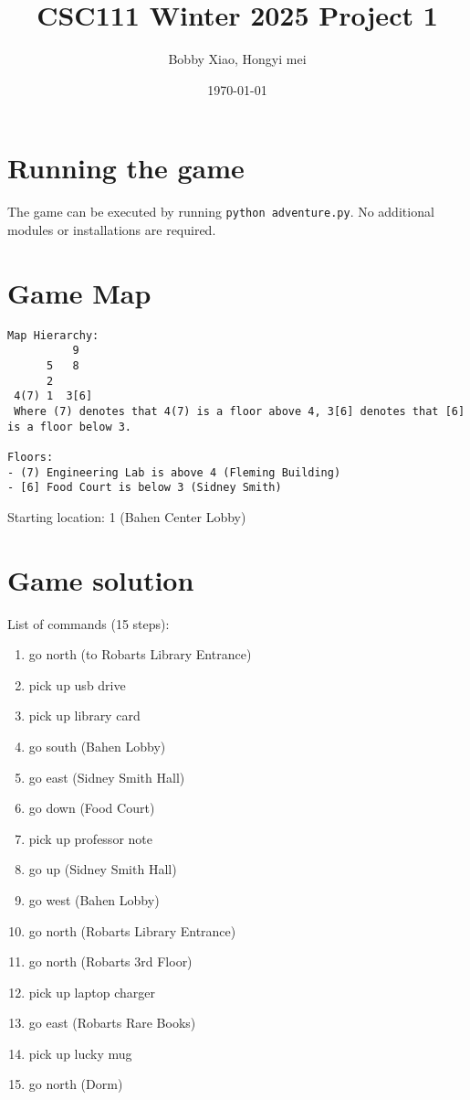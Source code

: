 \documentclass[11pt]{article}
\title{CSC111 Winter 2025 Project 1}
\author{Bobby Xiao, Hongyi mei}
\date{\today}
\begin{document}
\maketitle

\section*{Running the game}
The game can be executed by running \texttt{python adventure.py}. No additional modules or installations are required.

\section*{Game Map}
\begin{verbatim}
Map Hierarchy:
          9
      5   8
      2   
 4(7) 1  3[6]
 Where (7) denotes that 4(7) is a floor above 4, 3[6] denotes that [6] is a floor below 3.
 
Floors:
- (7) Engineering Lab is above 4 (Fleming Building)
- [6] Food Court is below 3 (Sidney Smith)
\end{verbatim}

Starting location: 1 (Bahen Center Lobby)

\section*{Game solution}
List of commands (15 steps):
\begin{enumerate}
    \item go north (to Robarts Library Entrance)
    \item pick up usb drive
    \item pick up library card
    \item go south (Bahen Lobby)
    \item go east (Sidney Smith Hall)
    \item go down (Food Court)
    \item pick up professor note
    \item go up (Sidney Smith Hall)
    \item go west (Bahen Lobby)
    \item go north (Robarts Library Entrance)
    \item go north (Robarts 3rd Floor)
    \item pick up laptop charger
    \item go east (Robarts Rare Books)
    \item pick up lucky mug
    \item go north (Dorm)
\end{enumerate}
\end{document}
